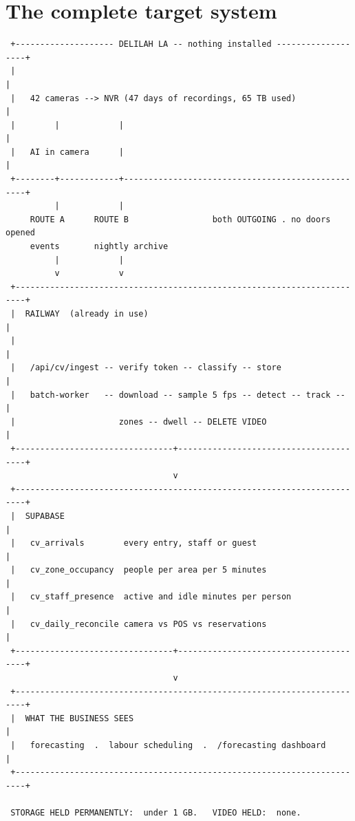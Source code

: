 \documentclass[11pt,a4paper]{article}
\begin{document}
\section{The complete target system}

\begin{verbatim}
 +-------------------- DELILAH LA -- nothing installed -------------------+
 |                                                                        |
 |   42 cameras --> NVR (47 days of recordings, 65 TB used)               |
 |        |            |                                                  |
 |   AI in camera      |                                                  |
 +--------+------------+--------------------------------------------------+
          |            |
     ROUTE A      ROUTE B                 both OUTGOING . no doors opened
     events       nightly archive
          |            |
          v            v
 +------------------------------------------------------------------------+
 |  RAILWAY  (already in use)                                             |
 |                                                                        |
 |   /api/cv/ingest -- verify token -- classify -- store                  |
 |   batch-worker   -- download -- sample 5 fps -- detect -- track --     |
 |                     zones -- dwell -- DELETE VIDEO                     |
 +--------------------------------+---------------------------------------+
                                  v
 +------------------------------------------------------------------------+
 |  SUPABASE                                                              |
 |   cv_arrivals        every entry, staff or guest                       |
 |   cv_zone_occupancy  people per area per 5 minutes                     |
 |   cv_staff_presence  active and idle minutes per person                |
 |   cv_daily_reconcile camera vs POS vs reservations                     |
 +--------------------------------+---------------------------------------+
                                  v
 +------------------------------------------------------------------------+
 |  WHAT THE BUSINESS SEES                                                |
 |   forecasting  .  labour scheduling  .  /forecasting dashboard         |
 +------------------------------------------------------------------------+

 STORAGE HELD PERMANENTLY:  under 1 GB.   VIDEO HELD:  none.
\end{verbatim}
\end{document}
